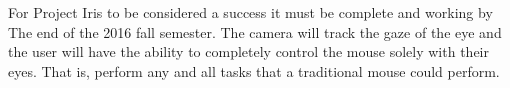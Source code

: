 
For Project Iris to be considered a success it must be complete and working by The end of the 2016 fall semester.  The camera will track the gaze of the eye and the user will have the ability to completely control the mouse solely with their eyes.  That is, perform any and all tasks that a traditional mouse could perform.